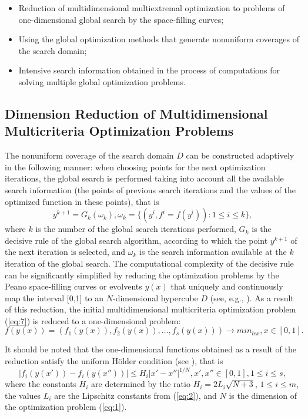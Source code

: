\documentclass[smallextended]{svjour3}       %
\begin{document}
\begin{itemize}
	\item Reduction of multidimensional multiextremal optimization to problems of one-dimensional global search by the space-filling curves;
	\item Using the global optimization methods that generate nonuniform coverages of the search domain;
	\item Intensive search information obtained in the process of computations for solving multiple global optimization problems.
\end{itemize}

\subsection{Dimension Reduction of Multidimensional Multicriteria Optimization Problems}

The nonuniform coverage of the search domain $D$ can be constructed adaptively in the following manner: when choosing points for the next optimization iterations, the global search is performed taking into account all the available search information (the points of previous search iterations and the values of the optimized function in these points), that is
\begin{equation}\label{eq:11}
y^{k+1}=G_k(\omega_k), \omega_k=\{(y^i,f^i=f(y^i)): 1 \leq i \leq k \},
\end{equation}
where $k$ is the number of the global search iterations performed, $G_k$ is the decisive rule of the global search algorithm, according to which the point $y^{k+1}$ of the next iteration is selected, and $\omega_k$ is the search information available at the $k$ iteration of the global search. The computational complexity of the decisive rule can be significantly simplified by reducing the optimization problems by the Peano space-filling curves or evolvents $y(x)$ that uniquely and continuously map the interval [0,1] to an $N$-dimensional hypercube $D$ (see, e.g., \cite{c17,c18,c23}). As a result of this reduction, the initial multidimensional multicriteria optimization problem (\ref{eq:7}) is reduced to a one-dimensional problem:
\begin{equation}\label{eq:12}
f(y(x)) = (f_1(y(x)), f_2(y(x)), \dots, f_s(y(x))) \to min_{lex},  x \in [0,1].
\end{equation}

It should be noted that the one-dimensional functions obtained as a result of the reduction satisfy the uniform H\"older condition (see \cite{c17,c18}), that is
\begin{equation}\label{eq:13}
|f_i (y(x'))-f_i (y(x''))| \leq H_i |x'-x''|^{1/N}, x',x''\in [0,1], 1 \leq i \leq s,
\end{equation}
where the constants $H_i$ are determined by the ratio $H_i=2L_i\sqrt{N+3}$,  $1 \leq i \leq m$, the values $L_i$ are the Lipschitz constants from (\ref{eq:2}), and $N$ is the dimension of the optimization problem (\ref{eq:1}).
\end{document}

